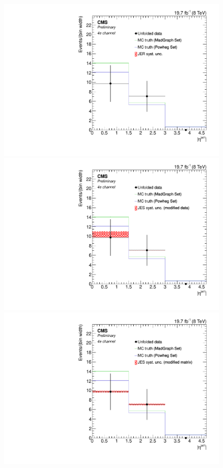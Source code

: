 \begin{figure}[hbtp]
\begin{center}
   \includegraphics[width=0.8\cmsFigWidth]{Figures/Unfolding/Systematics/ZZTo4e_EtaJet1_JER_Mad_fr}
   \includegraphics[width=0.8\cmsFigWidth]{Figures/Unfolding/Systematics/ZZTo4e_EtaJet1_JES_ModData_Mad_fr}     
   \includegraphics[width=0.8\cmsFigWidth]{Figures/Unfolding/Systematics/ZZTo4e_EtaJet1_JES_ModMat_Mad_fr}

\end{center}
\end{figure}
